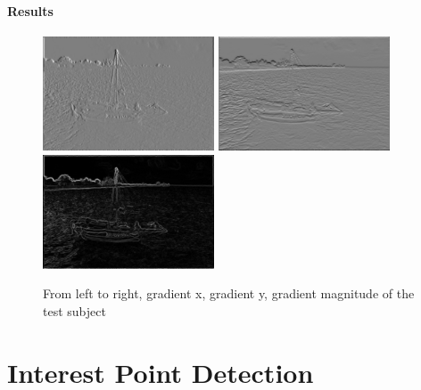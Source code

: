 \documentclass[a4paper, 10pt]{article}
\begin{document}
\paragraph{Results}
\begin{figure}[!htb]
\centering
\includegraphics[width=192px]{boat3x3_5_grad_x.png}
\includegraphics[width=192px]{boat3x3_5_grad_y.png}
\includegraphics[width=192px]{boat3x3_5_grad_mag.png}
\caption{From left to right, gradient x, gradient y, gradient magnitude of the test subject}
\label{fig-gradient}
\end{figure}


\section{Interest Point Detection}

\begin{lstlisting}[frame=single]
\end{lstlisting}
\end{document}
